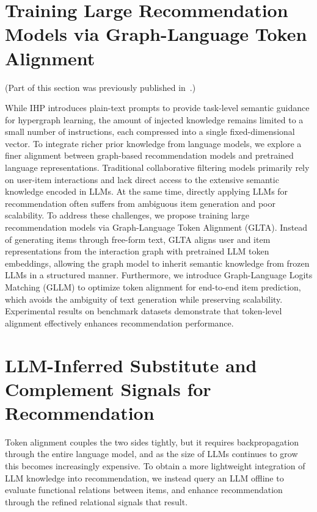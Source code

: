 \section{Training Large Recommendation Models via Graph-Language Token Alignment}
(Part of this section was previously published in~\cite{glta}.)

While IHP introduces plain-text prompts to provide task-level semantic guidance for hypergraph learning, the amount of injected knowledge remains limited to a small number of instructions, each compressed into a single fixed-dimensional vector. To integrate richer prior knowledge from language models, we explore a finer alignment between graph-based recommendation models and pretrained language representations. Traditional collaborative filtering models primarily rely on user-item interactions and lack direct access to the extensive semantic knowledge encoded in LLMs. At the same time, directly applying LLMs for recommendation often suffers from ambiguous item generation and poor scalability.
To address these challenges, we propose training large recommendation models via Graph-Language Token Alignment (GLTA). Instead of generating items through free-form text, GLTA aligns user and item representations from the interaction graph with pretrained LLM token embeddings, allowing the graph model to inherit semantic knowledge from frozen LLMs in a structured manner. Furthermore, we introduce Graph-Language Logits Matching (GLLM) to optimize token alignment for end-to-end item prediction, which avoids the ambiguity of text generation while preserving scalability. Experimental results on benchmark datasets demonstrate that token-level alignment effectively enhances recommendation performance.

\section{LLM-Inferred Substitute and Complement Signals for Recommendation}
Token alignment couples the two sides tightly, but it requires backpropagation through the entire language model, and as the size of LLMs continues to grow this becomes increasingly expensive. To obtain a more lightweight integration of LLM knowledge into recommendation, we instead query an LLM offline to evaluate functional relations between items, and enhance recommendation through the refined relational signals that result.

